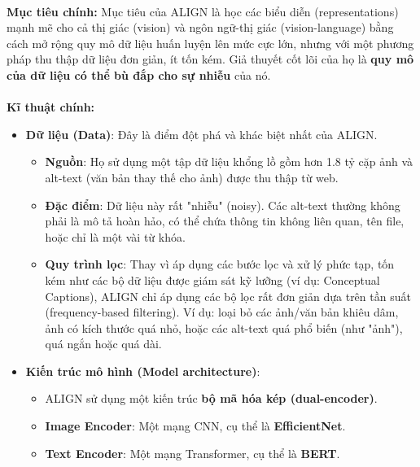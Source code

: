 \paragraph{}{\textbf{Mục tiêu chính:} Mục tiêu của ALIGN là học các biểu diễn (representations) mạnh mẽ cho cả thị giác (vision) và ngôn ngữ-thị giác (vision-language) bằng cách mở rộng quy mô dữ liệu huấn luyện lên mức cực lớn, nhưng với một phương pháp thu thập dữ liệu đơn giản, ít tốn kém. Giả thuyết cốt lõi của họ là \textbf{quy mô của dữ liệu có thể bù đắp cho sự nhiễu} của nó.}

\paragraph{}{\textbf{Kĩ thuật chính:}}

\begin{itemize}
    \item \textbf{Dữ liệu (Data)}: Đây là điểm đột phá và khác biệt nhất của ALIGN. 
    \begin{itemize}
        \item \textbf{Nguồn}: Họ sử dụng một tập dữ liệu khổng lồ gồm hơn 1.8 tỷ cặp ảnh và alt-text (văn bản thay thế cho ảnh) được thu thập từ web.

        \item \textbf{Đặc điểm}: Dữ liệu này rất "nhiễu" (noisy). Các alt-text thường không phải là mô tả hoàn hảo, có thể chứa thông tin không liên quan, tên file, hoặc chỉ là một vài từ khóa.

        \item \textbf{Quy trình lọc}: Thay vì áp dụng các bước lọc và xử lý phức tạp, tốn kém như các bộ dữ liệu được giám sát kỹ lưỡng (ví dụ: Conceptual Captions), ALIGN chỉ áp dụng các bộ lọc rất đơn giản dựa trên tần suất (frequency-based filtering). Ví dụ: loại bỏ các ảnh/văn bản khiêu dâm, ảnh có kích thước quá nhỏ, hoặc các alt-text quá phổ biến (như "ảnh"), quá ngắn hoặc quá dài.
    \end{itemize}

    \item \textbf{Kiến trúc mô hình (Model architecture)}:
    \begin{itemize}
        \item ALIGN sử dụng một kiến trúc \textbf{bộ mã hóa kép (dual-encoder)}.

        \item \textbf{Image Encoder}: Một mạng CNN, cụ thể là \textbf{EfficientNet}.

        \item \textbf{Text Encoder}: Một mạng Transformer, cụ thể là \textbf{BERT}.


\end{itemize}
\end{itemize}

